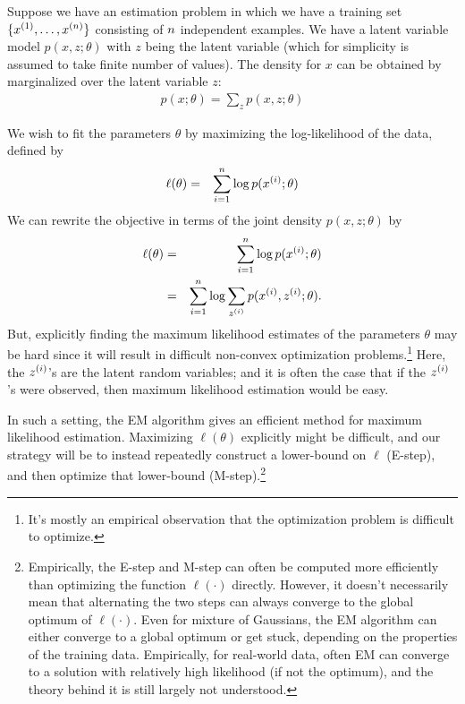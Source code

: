 \documentclass{article}
\begin{document}
\newcommand{\cD}{\mathcal{D}}
Suppose we have an estimation problem in which
we have a training set $\{x^{(1)}, \ldots, x^{({n})}\}$ consisting
of ${n}$ independent examples.  We have a latent variable model $p(x,z;\theta)$ with $z$ being the latent variable (which for simplicity is assumed to take finite number of values). The density for $x$ can be obtained by marginalized over the latent variable $z$:
\begin{align}
p(x;\theta) = \sum_z p(x,z;\theta)
\end{align}


We wish to fit the parameters $\theta$ by maximizing the log-likelihood of the data, defined by
\begin{eqnarray}
	\ell(\theta) &=& \sum_{i=1}^{n} \log p(x^{(i)};\theta) \label{eqn:empirical}
\end{eqnarray}
We can rewrite the objective in terms of the joint density $p(x,z;\theta)$ by
\begin{eqnarray}
\ell(\theta) &=& \sum_{i=1}^{n} \log p(x^{(i)};\theta) \\
&=& \sum_{i=1}^{n} \log \sum_{z^{(i)}} p(x^{(i)},z^{(i)}; \theta).
\end{eqnarray}
But, explicitly finding the maximum likelihood estimates of the parameters
$\theta$ may be hard since it will result in difficult non-convex optimization problems.\footnote{It's mostly an empirical observation that the optimization problem is difficult to optimize.} Here, the ${z^{(i)}}$'s are the latent random variables;
and it is often the case that if the ${z^{(i)}}$'s were observed, then
maximum likelihood estimation would be easy.

In such a setting, the EM algorithm gives an efficient method for
maximum likelihood estimation.  Maximizing $\ell(\theta)$
explicitly might be difficult, and our strategy will be to instead
repeatedly
construct a lower-bound on $\ell$ (E-step), and then optimize
that lower-bound (M-step).\footnote{Empirically, the E-step and M-step can often be computed more efficiently than optimizing the function $\ell(\cdot)$ directly. However, it doesn't necessarily mean that alternating the two steps can always converge to the global optimum of $\ell(\cdot)$. Even for mixture of Gaussians, the EM algorithm can either converge to a global optimum or get stuck, depending on the properties of the training data. Empirically, for real-world data, often EM can converge to a solution with relatively high likelihood (if not the optimum), and the theory behind it is still largely not understood. }
\end{document}
